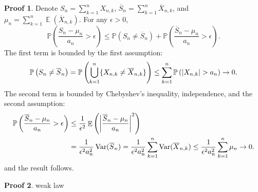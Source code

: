 \documentclass[hidelinks,11pt]{article}
\theoremstyle{definition}
\theoremstyle{dotless}
\newtheorem{prop}{Proof}[section]
\theoremstyle{remark}
\DeclareMathOperator{\Var}{Var}
\DeclareMathOperator{\E}{\mathbb{E}}
\DeclareMathOperator{\1}{\mathbf{1}}
\DeclareMathOperator{\0}{\mathbf{0}}
\begin{document}
\begin{prop}
Denote $S_n=\sum_{k=1}^nX_{n,k}$, $\overline{S}_n=\sum_{k=1}^n\overline{X}_{n,k}$, and $\mu_n=\sum_{k=1}^n\E(\overline{X}_{n,k})$. For any $\epsilon>0$,
\[\mathbb{P}\left({\frac{S_n-\mu_n}{a_n}}>\epsilon\right)\leq\mathbb{P}(S_n\neq\overline{S}_n)+\mathbb{P}\left({\frac{\overline{S}_n-\mu_n}{a_n}}>\epsilon\right).\]
The first term is bounded by the first assumption:
\[\mathbb{P}\left(S_n\neq\overline{S}_n\right)=\mathbb{P}\left(\bigcup_{k=1}^n\{X_{n,k}\neq\overline{X}_{n,k}\}\right)\leq\sum_{k=1}^n\mathbb{P}\left(\abs{X_{n,k}}>a_n\right)\to0.\]
The second term is bounded by Chebyshev's inequality, independence, and the second assumption:
\begin{align*}
\mathbb{P}\left({\frac{\overline{S}_n-\mu_n}{a_n}}>\epsilon\right)&\leq\frac{1}{\epsilon^2}\E\left(\abs{\frac{\overline{S}_n-\mu_n}{a_n}}^2\right)\\
&=\frac{1}{\epsilon^2a_n^2}\Var(\overline{S}_n)=\frac{1}{\epsilon^2a_n^2}\sum_{k=1}^n\Var(\overline{X}_{n,k})\leq\frac{1}{\epsilon^2a_n^2}\sum_{k=1}^n\mu_n\to0.
\end{align*}
and the result follows.
\end{prop}

\begin{prop}
weak law
\end{prop}
\end{document}
